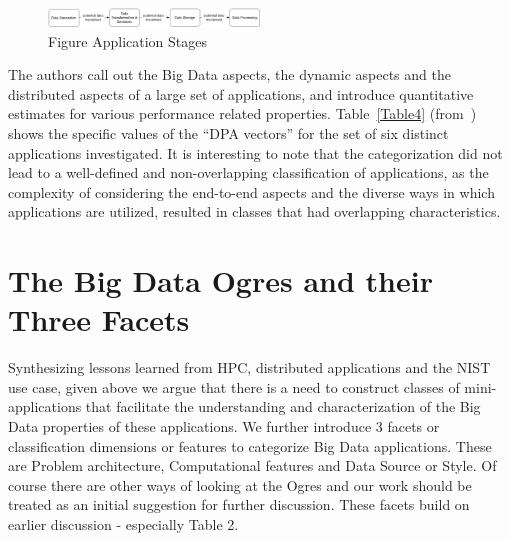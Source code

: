 \documentclass{acm_proc_article-sp}
\begin{document}
\begin{figure}
\centering
\includegraphics[width=0.5\textwidth]{fig1.png}
\caption{Figure Application Stages}
\label{figure1}
\end{figure}

The authors call out the Big Data aspects, the dynamic aspects and the distributed aspects of a large set of applications, and introduce quantitative estimates for various performance related properties. Table~\ref{Table4} (from~\cite{b26}) shows the specific values of the ``DPA vectors'' for the set of six distinct applications investigated. It is interesting to note that the categorization did not lead to a well-defined and non-overlapping classification of applications, as the complexity of considering the end-to-end aspects and the diverse ways in which applications are utilized, resulted in classes that had overlapping characteristics.



\section{The Big Data Ogres and their Three Facets}


Synthesizing lessons learned from HPC, distributed applications and the NIST use case, given above we argue that there is a need to construct classes of mini-applications that facilitate the understanding and characterization of the Big Data properties of these applications. We further introduce 3 facets or classification dimensions or features to categorize Big Data applications. These are Problem architecture, Computational features and Data Source or Style. Of course there are other ways of looking at the Ogres and our work should be treated as an initial suggestion for further discussion. These facets build on earlier discussion - especially Table 2.
\end{document}
